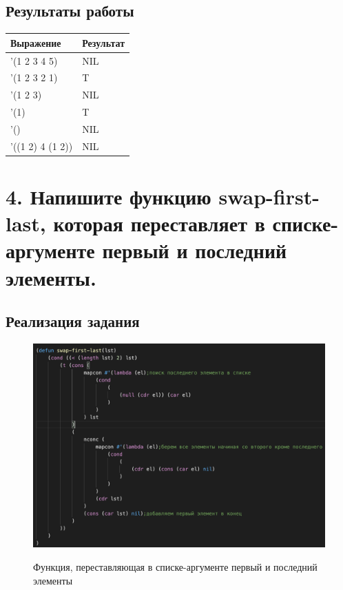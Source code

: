 \documentclass[a4paper,12pt]{article}
\begin{document}
 	\subsection*{Результаты работы}
 	
 	\begin{table} [h!]
 		\begin{center}
 			\begin{tabular}{|l|l|}
 				\hline
 				{\bf  Выражение} &    {\bf Результат} \\
 				\hline
 				{'(1 2 3 4 5)} & NIL\\
 				\hline
 				{'(1 2 3 2 1)} & T\\
 				\hline
 				{'(1 2 3)} & NIL\\
 				\hline
 				{'(1)} & T\\
 				\hline
 				{'()} & NIL\\
 				\hline
 				{'((1 2) 4 (1 2))} & NIL\\
 				\hline
 			\end{tabular}  
 			\label{m1}
 		\end{center}
 	\end{table}
 	
 	\newpage
	
	\section*{4. Напишите функцию swap-first-last, которая переставляет в списке-аргументе первый и последний элементы.}
	
	\subsection*{Реализация задания}
	
	\begin{figure}[h!]
		\begin{center}
			{\includegraphics[scale = 0.7]{4.png}}
			\label{ris:4}
		\end{center}
		\caption{Функция, переставляющая в списке-аргументе первый и последний элементы}
	\end{figure}
	
\end{document}
